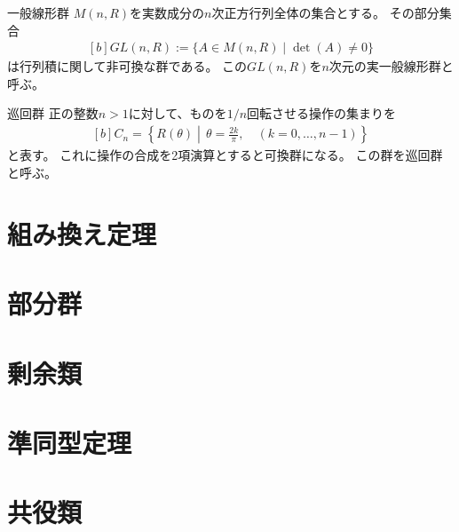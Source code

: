 \documentclass[../master.tex]{subfiles}
\begin{document}
\begin{examplebox}{一般線形群}{}
    \(M(n,R)\)を実数成分の\(n\)次正方行列全体の集合とする。
    その部分集合
    \begin{equation*}\begin{aligned}[b]
        GL(n,R) := \{A\in M(n,R)\mid \det(A)\neq 0\}
    \end{aligned}\end{equation*}
    は行列積に関して非可換な群である。
    この\(GL(n,R)\)を\(n\)次元の実一般線形群と呼ぶ。
\end{examplebox}

\begin{examplebox}{巡回群}{}
    正の整数\(n>1\)に対して、ものを\(1/n\)回転させる操作の集まりを
    \begin{equation*}\begin{aligned}[b]
        C_n = \left\{R(\theta)\middle|\, \theta = \frac{2k}{\pi}, \quad(k=0,\ldots, n-1)\right\}
    \end{aligned}\end{equation*}
    と表す。
    これに操作の合成を2項演算とすると可換群になる。
    この群を巡回群と呼ぶ。
\end{examplebox}


\section{組み換え定理}
\section{部分群}
\section{剰余類}
\section{準同型定理}
\section{共役類}
\end{document}

